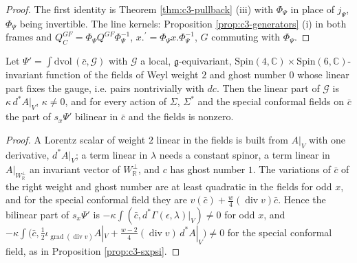 \begin{proof}
The first identity is Theorem \ref{thm:c3-pullback} (iii) with $\Phi_\Psi$ in place of $j_\Psi$, $\Phi_\Psi$ being invertible. The line kernels: Proposition \ref{prop:c3-generators} (i) in both frames and $Q^{GF}_C=\Phi_\Psi Q^{GF}\Phi_\Psi^{-1}$, $x.^{\prime}=\Phi_\Psi x.\Phi_\Psi^{-1}$, $G$ commuting with $\Phi_\Psi$.
\end{proof}

\begin{proposition}
\label{prop:c3-noinv}
Let $\Psi'=\int\mathrm{dvol}\,(\bar c,\mathcal G)$ with $\mathcal G$ a local, $\mathfrak g$-equivariant, $\mathrm{Spin}(4,\mathbb C)\times\mathrm{Spin}(6,\mathbb C)$-invariant function of the fields of Weyl weight $2$ and ghost number $0$ whose linear part fixes the gauge, i.e. pairs nontrivially with $dc$. Then the linear part of $\mathcal G$ is $\kappa\,d^*A|_V$, $\kappa\neq0$, and for every action of $\Sigma$, $\Sigma^*$ and the special conformal fields on $\bar c$ the part of $s_x\Psi'$ bilinear in $\bar c$ and the fields is nonzero.
\end{proposition}

\begin{proof}
A Lorentz scalar of weight $2$ linear in the fields is built from $A|_V$ with one derivative, $d^*A|_V$; a term linear in $\lambda$ needs a constant spinor, a term linear in $A|_{W_{\mathbb R}^\perp}$ an invariant vector of $W_{\mathbb R}^\perp$, and $c$ has ghost number $1$. The variations of $\bar c$ of the right weight and ghost number are at least quadratic in the fields for odd $x$, and for the special conformal field they are $v(\bar c)+\tfrac w4(\operatorname{div}v)\bar c$. Hence the bilinear part of $s_x\Psi'$ is $-\kappa\int(\bar c,d^*\Gamma(\epsilon,\lambda)|_V)\neq0$ for odd $x$, and $-\kappa\int\big(\bar c,\tfrac12\iota_{\operatorname{grad}(\operatorname{div}v)}A|_V+\tfrac{w-2}4(\operatorname{div}v)\,d^*A|_V\big)\neq0$ for the special conformal field, as in Proposition \ref{prop:c3-sxpsi}.
\end{proof}

